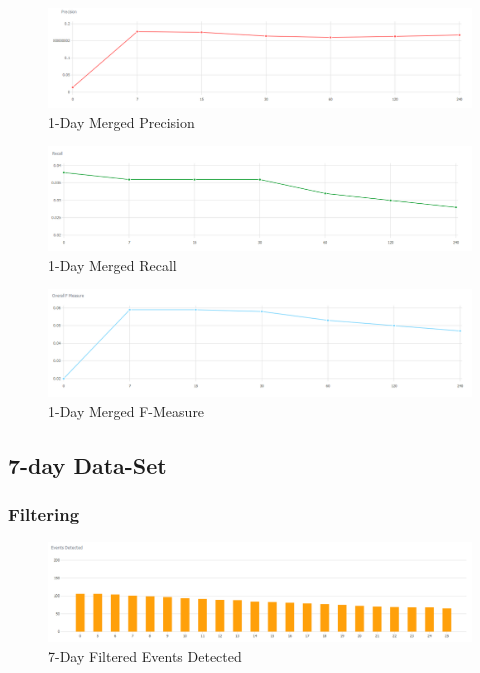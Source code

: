\documentclass[a4paper,portrait,12pt]{article}
\begin{document}
\begin{figure}[H]
	\centering
	\includegraphics[width=\linewidth]{images/1day-merged-precision.png}
	\caption{1-Day Merged Precision}
	\label{fig:1day-merged-precision}
\end{figure}

\begin{figure}[H]
	\centering
	\includegraphics[width=\linewidth]{images/1day-merged-recall.png}
	\caption{1-Day Merged Recall}
	\label{fig:1day-merged-recall}
\end{figure}

\begin{figure}[H]
	\centering
	\includegraphics[width=\linewidth]{images/1day-merged-f-measure.png}
	\caption{1-Day Merged F-Measure}
	\label{fig:1day-merged-f-measure}
\end{figure}

\subsection{7-day Data-Set}
\subsubsection{Filtering}

\begin{figure}[H]
	\centering
	\includegraphics[width=\linewidth]{images/7days-filtered-events-detected.png}
	\caption{7-Day Filtered Events Detected}
	\label{fig:7day-filtered-events-detected}
\end{figure}
\end{document}

